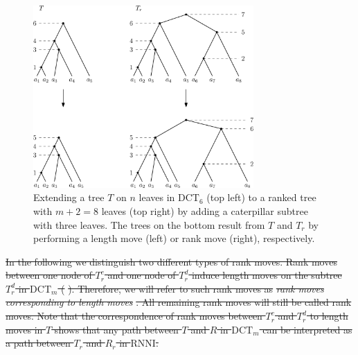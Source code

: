 \documentclass[11pt]{amsart}
\newcommand{\rnni}{\mathrm{RNNI}}
\newcommand{\dct}{\mathrm{DCT}}
\newcommand{\summary}[1]{} %
\providecommand{\DIFdeltex}[1]{{\protect\color{red}\sout{#1}}}                      %
\providecommand{\DIFdelbegin}{} %
\providecommand{\DIFdelend}{} %
\providecommand{\DIFdel}[1]{\texorpdfstring{\DIFdeltex{#1}}{}} %
\newcommand{\DIFscaledelfig}{0.5}
\newlength{\DIFdelgraphicswidth} %
\newlength{\DIFdelgraphicsheight} %
\newcommand{\DIFdelincludegraphics}[2][]{%
\sbox{\DIFdelgraphicsbox}{\DIFOincludegraphics[#1]{#2}}%
\settoboxwidth{\DIFdelgraphicswidth}{\DIFdelgraphicsbox} %
\settoboxtotalheight{\DIFdelgraphicsheight}{\DIFdelgraphicsbox} %
\scalebox{\DIFscaledelfig}{%
\parbox[b]{\DIFdelgraphicswidth}{\usebox{\DIFdelgraphicsbox}\\[-\baselineskip] \rule{\DIFdelgraphicswidth}{0em}}\llap{\resizebox{\DIFdelgraphicswidth}{\DIFdelgraphicsheight}{%
\setlength{\unitlength}{\DIFdelgraphicswidth}%
\begin{picture}(1,1)%
\thicklines\linethickness{2pt} %
{\color[rgb]{1,0,0}\put(0,0){\framebox(1,1){}}}%
{\color[rgb]{1,0,0}\put(0,0){\line( 1,1){1}}}%
{\color[rgb]{1,0,0}\put(0,1){\line(1,-1){1}}}%
\end{picture}%
}\hspace*{3pt}}} %
} %
\DeclareRobustCommand{\DIFdelbegin}{\DIFOdelbegin \let\includegraphics\DIFdelincludegraphics} %
\DeclareRobustCommand{\DIFdelend}{\DIFOaddend \let\includegraphics\DIFOincludegraphics} %
\begin{document}
\begin{figure}[ht]
	\includegraphics[width=0.75\textwidth]{dtt_to_ranked_tree.eps}
	\caption{Extending a tree $T$ on $n$ leaves in $\dct_6$ (top left) to a ranked tree with $m+2=8$ leaves (top right) by adding a caterpillar subtree with three leaves.
	The trees on the bottom result from $T$ and $T_r$ by performing a length move (left) or rank move (right), respectively.}
	\label{fig:dtt_to_ranked_tree}
\end{figure}

\summary{Moves on the extended ranked versions of trees -- $\rnni$ vs length moves}
\DIFdelbegin \DIFdel{In the following we distinguish two different types of rank moves.
Rank moves between one node of $T_r^c$ and one node of $T_r^d$ induce length moves on the subtree $T_r^d$ in $\dct_m$ (}%
\DIFdel{).
Therefore, we will refer to such rank moves as }\emph{\DIFdel{rank moves corresponding to length moves}}%
\DIFdel{.
All remaining rank moves will still be called rank moves.
Note that the correspondence of rank moves between $T_r^c$ and $T_r^d$ to length moves in $T$ shows that any path between $T$ and $R$ in $\dct_m$ can be interpreted as a path between $T_r$ and $R_r$ in $\rnni$.
}\DIFdelend 
\end{document}
